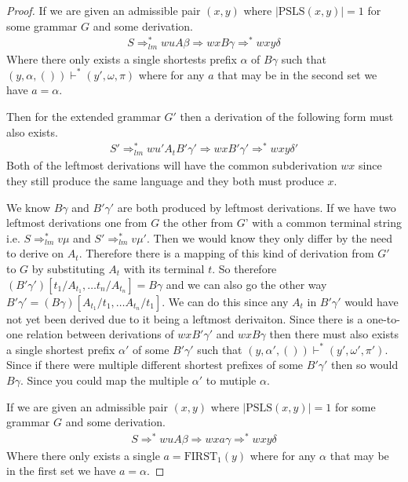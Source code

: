 \documentclass[a4paper,12pt]{article}
\newcommand\PSLS{\text{PSLS}}
\theoremstyle{definition}
\begin{document}
\begin{proof}
  If we are given an admissible pair $(x, y)$ where $|\PSLS(x, y)| = 1$ for some grammar $G$ and some derivation.
  \begin{align*}
    S \Rightarrow^*_{lm} wuA\beta \Rightarrow wxB\gamma \Rightarrow^* wxy\delta
  \end{align*}
  Where there only exists a single shortests prefix $\alpha$ of $B\gamma$ such that $(y, \alpha, ()) \vdash^* (y', \omega, \pi)$ where for any $a$ that may be in the second set we have $a = \alpha$.

  Then for the extended grammar $G'$ then a derivation of the following form must also exists.
  \begin{align*}
    S' \Rightarrow^*_{lm} wu'A_tB'\gamma' \Rightarrow wxB'\gamma' \Rightarrow^* wxy\delta'
  \end{align*}
  Both of the leftmost derivations will have the common subderivation $wx$ since they still produce the same language and they both must produce $x$. 

  We know $B\gamma$ and $B'\gamma'$ are both produced by leftmost derivations. If we have two leftmost derivations one from $G$ the other from $G$' with a common terminal string i.e. $S \Rightarrow^*_{lm} v\mu$ and $S' \Rightarrow^*_{lm} v\mu'$. Then we would know they only differ by the need to derive on $A_t$. Therefore there is a mapping of this kind of derivation from $G'$ to $G$ by substituting $A_t$ with its terminal $t$. So therefore $(B'\gamma')[t_1/A_{t_1}, \dots t_n/A_{t_n}] = B\gamma$ and we can also go the other way $B'\gamma' = (B\gamma)[A_{t_1}/t_1, \dots A_{t_n}/t_1]$. We can do this since any $A_t$ in $B'\gamma'$ would have not yet been derived due to it being a leftmost derivaiton. Since there is a one-to-one relation between derivations of $wxB'\gamma'$ and $wxB\gamma$ then there must also exists a single shortest prefix $\alpha'$ of some $B'\gamma'$ such that $(y, \alpha', ()) \vdash^* (y', \omega', \pi')$. Since if there were multiple different shortest prefixes of some $B'\gamma'$ then so would $B\gamma$. Since you could map the multiple $\alpha'$ to mutiple $\alpha$.

  If we are given an admissible pair $(x, y)$ where $|\PSLS(x, y)| = 1$ for some grammar $G$ and some derivation.
  \begin{align*}
    S \Rightarrow^* wuA\beta \Rightarrow wxa\gamma \Rightarrow^* wxy\delta
  \end{align*}
  Where there only exists a single $a = \text{FIRST}_1(y)$  where for any $\alpha$ that may be in the first set we have $a = \alpha$.


\end{proof}
\end{document}
